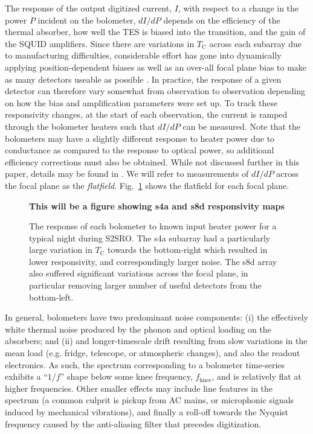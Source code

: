 \documentclass[useAMS,usenatbib,nofootinbib]{mn2e}
\begin{document}
The response of the output digitized current, $I$, with respect to a
change in the power $P$ incident on the bolometer, $dI/dP$ depends on
the efficiency of the thermal absorber, how well the TES is biased
into the transition, and the gain of the SQUID amplifiers. Since there
are variations in $T_\mathrm{C}$ across each subarray due to
manufacturing difficulties, considerable effort has gone into
dynamically applying position-dependent biases as well as an over-all
focal plane bias to make as many detectors useable as possible
\citep{holland2011}. In practice, the response of a given detector can
therefore vary somewhat from observation to observation depending on
how the bias and amplification parameters were set up. To track these
responsivity changes, at the start of each observation, the current is
ramped through the bolometer heaters such that $dI/dP$ can be
measured. Note that the bolometers may have a slightly different
response to heater power due to conductance as compared to the
response to optical power, so additioanl efficiency corrections must
also be obtained. While not discussed further in this paper, details
may be found in \citet{dempsey2011}. We will refer to measurements of
$dI/dP$ across the focal plane as the
\emph{flatfield}. Fig.~\ref{fig:sensitivities} shows the flatfield for
each focal plane.

\begin{figure}
\vspace{2cm}
\textbf{This will be a figure showing s4a and s8d responsivity maps}
\vspace{2cm}
\caption{The response of each bolometer to known input heater power
  for a typical night during S2SRO. The s4a subarray had a
  particularly large variation in $T_\mathrm{C}$ towards the
  bottom-right which resulted in lower responsivity, and
  correspondingly larger noise. The s8d array also suffered
  significant variations across the focal plane, in particular
  removing larger number of useful detectors from the bottom-left.}
\label{fig:sensitivities}
\end{figure}


In general, bolometers have two predominant noise components: (i) the
effectively white thermal noise produced by the phonon and optical
loading on the absorbers; and (ii) and longer-timescale drift
resulting from slow variations in the mean load (e.g. fridge,
telescope, or atmospheric changes), and also the readout
electronics. As such, the spectrum corresponding to a bolometer
time-series exhibits a ``$1/f$'' shape below some knee frequency,
$f_\mathrm{knee}$, and is relatively flat at higher frequencies. Other
smaller effects may include line features in the spectrum (a common
culprit is pickup from AC mains, or microphonic signals induced by
mechanical vibrations), and finally a roll-off towards the Nyquist
frequency caused by the anti-aliasing filter that precedes
digitization.
\end{document}
